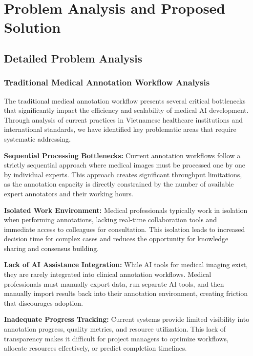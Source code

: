 \chapter{Problem Analysis and Proposed Solution}

\section{Detailed Problem Analysis}

\subsection{Traditional Medical Annotation Workflow Analysis}

The traditional medical annotation workflow presents several critical bottlenecks that significantly impact the efficiency and scalability of medical AI development. Through analysis of current practices in Vietnamese healthcare institutions and international standards, we have identified key problematic areas that require systematic addressing.

\textbf{Sequential Processing Bottlenecks:} Current annotation workflows follow a strictly sequential approach where medical images must be processed one by one by individual experts. This approach creates significant throughput limitations, as the annotation capacity is directly constrained by the number of available expert annotators and their working hours.

\textbf{Isolated Work Environment:} Medical professionals typically work in isolation when performing annotations, lacking real-time collaboration tools and immediate access to colleagues for consultation. This isolation leads to increased decision time for complex cases and reduces the opportunity for knowledge sharing and consensus building.

\textbf{Lack of AI Assistance Integration:} While AI tools for medical imaging exist, they are rarely integrated into clinical annotation workflows. Medical professionals must manually export data, run separate AI tools, and then manually import results back into their annotation environment, creating friction that discourages adoption.

\textbf{Inadequate Progress Tracking:} Current systems provide limited visibility into annotation progress, quality metrics, and resource utilization. This lack of transparency makes it difficult for project managers to optimize workflows, allocate resources effectively, or predict completion timelines.

